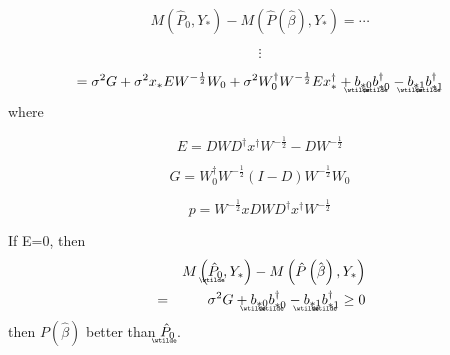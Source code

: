 \documentclass{article}
\begin{document}
\bigskip

\begin{equation*}
M\left( \hat{P}_{0},Y_{\ast }\right) -M\left( \hat{P}\left( \hat{\beta}%
\right) ,Y_{\ast }\right) =\cdots
\end{equation*}

\begin{equation*}
\vdots
\end{equation*}

\begin{equation*}
=\sigma ^{2}G+\sigma ^{2}x_{\ast }EW^{-\frac{1}{2}}W_{0}+\sigma
^{2}W_{0}^{\dagger }W^{-\frac{1}{2}}Ex_{\ast }^{\dagger }+%
\underaccent{\wtilde}{b}%
_{\ast 0}%
\underaccent{\wtilde}{b}%
_{\ast 0}^{\dagger }-%
\underaccent{\wtilde}{b}%
_{\ast 1}%
\underaccent{\wtilde}{b}%
_{\ast 1}^{\dagger }
\end{equation*}%
where

\begin{equation*}
E=DWD^{\dagger }x^{\dagger }W^{-\frac{1}{2}}-DW^{-\frac{1}{2}}
\end{equation*}

\begin{equation*}
G=W_{0}^{\dagger }W^{-\frac{1}{2}}\left( I-D\right) W^{-\frac{1}{2}}W_{0}
\end{equation*}

\begin{equation*}
p=W^{-\frac{1}{2}}xDWD^{\dagger }x^{\dagger }W^{-\frac{1}{2}}
\end{equation*}

\bigskip

If E=0, then%
\begin{eqnarray*}
&&M\left( 
\underaccent{\wtilde}{\hat{P}}%
_{0},Y_{\ast }\right) -M\left( \hat{P}\left( \hat{\beta}\right) ,Y_{\ast
}\right) \\
&=&\sigma ^{2}G+%
\underaccent{\wtilde}{b}%
_{\ast 0}%
\underaccent{\wtilde}{b}%
_{\ast 0}^{\dagger }-%
\underaccent{\wtilde}{b}%
_{\ast 1}%
\underaccent{\wtilde}{b}%
_{\ast 1}^{\dagger }\geq 0
\end{eqnarray*}%
then $P\left( \hat{\beta}\right) $ better than $%
\underaccent{\wtilde}{\hat{P}}%
_{0}$.
\end{document}
